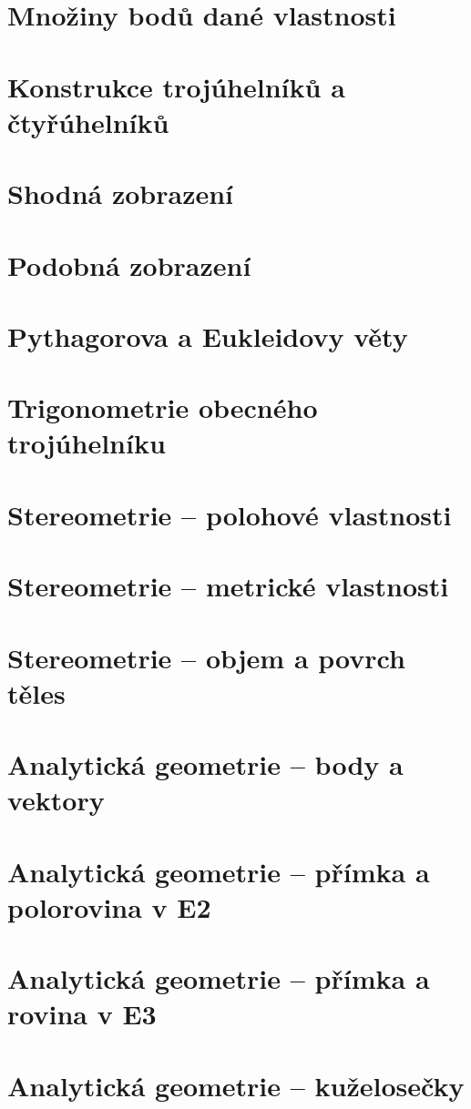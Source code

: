 \documentclass[12pt, a4paper]{article}
\begin{document}
\section{Množiny bodů dané vlastnosti}
\section{Konstrukce trojúhelníků a čtyřúhelníků}
\section{Shodná zobrazení}
\section{Podobná zobrazení}
\section{Pythagorova a Eukleidovy věty}
\section{Trigonometrie obecného trojúhelníku}
\section{Stereometrie – polohové vlastnosti}
\section{Stereometrie – metrické vlastnosti}
\section{Stereometrie – objem a povrch těles}
\section{Analytická geometrie – body a vektory}
\section{Analytická geometrie – přímka a polorovina v E2}
\section{Analytická geometrie – přímka a rovina v E3}
\section{Analytická geometrie – kuželosečky}
\end{document}
